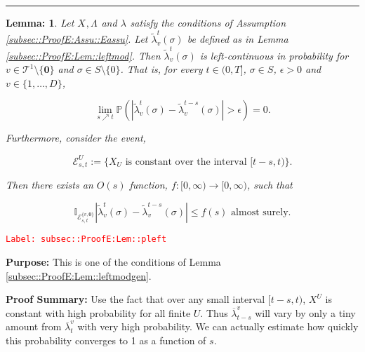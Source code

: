 \documentclass[12pt]{article}
\newcommand{\mb}{\mathbb}
\newcommand{\mc}{\mathcal}
\newcommand{\ra}{\rightarrow}
\newcommand{\ov}{\overline}
\newcommand{\te}{\text}
\newcommand{\ep}{\epsilon}
\newcommand{\tr}{\textcolor{red}}
\newcommand{\labe}[1]{\tr{\texttt{Label: #1}}}
\newcommand{\purpose}{\textbf{Purpose: }}
\newcommand{\pfsum}{\textbf{Proof Summary: }}
\newcommand{\lin}{\rule{\linewidth}{0.4 pt}}
\newcommand{\pr}{\mb{P}}							%
\renewcommand{\root}{\mathbf{0}}				%
\renewcommand{\v}{v}							%
\renewcommand{\U}{U}							%
\renewcommand{\S}{S}							%
\newcommand{\s}{\sigma}							%
\newcommand{\T}{T}								%
\renewcommand{\t}{t}							%
\newcommand{\degr}{D}								%
\newcommand{\pup}[1]{^{#1}}							%
\newcommand{\tree}{\mc{T}}							%
\renewcommand{\tt}{s}								%
\newcommand{\rxvts}[2]{X_{#1}{#2}}					%
\newcommand{\rate}[1]{\lambda_{#1}}					%
\newcommand{\ratee}[1]{\Lambda_{#1}}				%
\newcommand{\crate}[2]{\alt{\lambda}_{#1}^{#2}}		%
\newcommand{\alt}{\widetilde}						%
\newcommand{\evnt}{\mc{E}}						%
\newtheorem{lem}[thms]{Lemma: }
\begin{document}
\lin

\begin{lem}
Let \(\rxvts{}{},\ratee{}{}\) and \(\rate{}\) satisfy the conditions of Assumption \ref{subsec::ProofE:Assu::Eassu}. Let \(\crate{\v}{\t}(\s)\) be defined as in Lemma \ref{subsec::ProofE:Lem::leftmod}. Then \(\crate{\v}{\t}(\s)\) is left-continuous in probability for \(\v \in \tree\pup{1}\setminus\{\root\}\) and \(\s \in \S\setminus\{0\}\). That is, for every \(\t \in (0,\T]\), \(\s \in \S\), \(\ep > 0\) and \(\v\in \{1,\dots,\degr\}\),

\[\lim_{\tt \nearrow \t}\pr\left(|\crate{\v}{\t}(\s)- \crate{\v}{\t-\tt}(\s)| > \ep\right) = 0.\]

Furthermore, consider the event,

\[\evnt^\U_{\tt,\t} := \{\rxvts{\U}{} \te{ is constant over the interval } [\t-\tt,\t)\}.\]

Then there exists an \(O(s)\) function, \(f:[0,\infty)\ra[0,\infty)\), such that 

\[\mb{I}_{\evnt^{\{\v,\root\}}_{\tt,\t}}|\crate{\v}{\t}(\s) - \crate{\v}{\t-\tt}(\s)| \leq f(s) \te{ almost surely.}\]
\label{subsec::ProofE:Lem::pleft}
\end{lem}
\labe{subsec::ProofE:Lem::pleft}

\purpose This is one of the conditions of Lemma \ref{subsec::ProofE:Lem::leftmodgen}.

\pfsum Use the fact that over any small interval \([t-s,t)\), \(X^U\) is constant with high probability for all finite \(U\). Thus \(\ov{\lambda}^v_{t-s}\) will vary by only a tiny amount from \(\ov{\lambda}^v_t\) with very high probability. We can actually estimate how quickly this probability converges to 1 as a function of \(s\).
\end{document}
